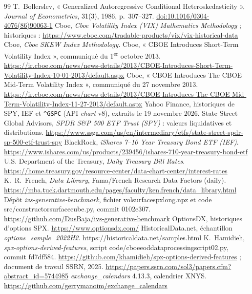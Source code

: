 \documentclass[10pt,a4paper]{article}
\newcommand{\coupure}{\textunderscore\allowbreak}
\newcommand{\fic}[1]{{\small\ttfamily\let\_\coupure #1}}
\begin{document}
{\begin{thebibliography}{99}
 T.~Bollerslev, « Generalized Autoregressive Conditional Heteroskedasticity », \emph{Journal of Econometrics}, 31(3), 1986, p.~307–327. \href{https://doi.org/10.1016/0304-4076(86)90063-1}{doi:10.1016/0304-4076(86)90063-1}
 Cboe, \emph{Cboe Volatility Index (VIX) Mathematics Methodology} ; historiques : \url{https://www.cboe.com/tradable-products/vix/vix-historical-data}
 Cboe, \emph{Cboe SKEW Index Methodology}.
 Cboe, « CBOE Introduces Short-Term Volatility Index », communiqué du 1\textsuperscript{er} octobre 2013. \url{https://ir.cboe.com/news/news-details/2013/CBOE-Introduces-Short-Term-Volatility-Index-10-01-2013/default.aspx}
 Cboe, « CBOE Introduces The CBOE Mid-Term Volatility Index », communiqué du 27 novembre 2013. \url{https://ir.cboe.com/news/news-details/2013/CBOE-Introduces-The-CBOE-Mid-Term-Volatility-Index-11-27-2013/default.aspx}
 Yahoo Finance, historiques de SPY, IEF et \texttt{\textasciicircum GSPC} (API \emph{chart} v8), extraits le 19 novembre 2026.
 State Street Global Advisors, \emph{SPDR S\&P 500 ETF Trust (SPY)} : valeurs liquidatives et distributions. \url{https://www.ssga.com/us/en/intermediary/etfs/state-street-spdr-sp-500-etf-trust-spy}
 BlackRock, \emph{iShares 7–10 Year Treasury Bond ETF (IEF)}. \url{https://www.ishares.com/us/products/239456/ishares-710-year-treasury-bond-etf}
 U.S. Department of the Treasury, \emph{Daily Treasury Bill Rates}. \url{https://home.treasury.gov/resource-center/data-chart-center/interest-rates}
 K.~R.~French, \emph{Data Library}, Fama/French Research Data Factors (daily). \url{https://mba.tuck.dartmouth.edu/pages/faculty/ken.french/data_library.html}
 Dépôt \emph{ivs-generative-benchmark}, fichier \fic{vol\_surface\_spx\_long.npz} et code \fic{src/constructor\_surface\_cube.py}, commit 0102e307. \url{https://github.com/DusBaja/ivs-generative-benchmark}
 OptionsDX, historiques d'options SPX. \url{https://www.optionsdx.com/}
 HistoricalData.net, échantillon \emph{options\_sample\_2022H2}. \url{https://historicaldata.net/samples.html}
 K.~Hamidieh, \emph{spx-options-derived-features}, script \fic{code/cboe\_eod\_data\_processing\_script\_02.py}, commit fd7df584. \url{https://github.com/khamidieh/spx-options-derived-features} ; document de travail SSRN, 2025. \url{https://papers.ssrn.com/sol3/papers.cfm?abstract_id=5744985}
 \emph{exchange\_calendars} 4.13.3, calendrier XNYS. \url{https://github.com/gerrymanoim/exchange_calendars}
\end{thebibliography}}
\label{derniere}
\end{document}
